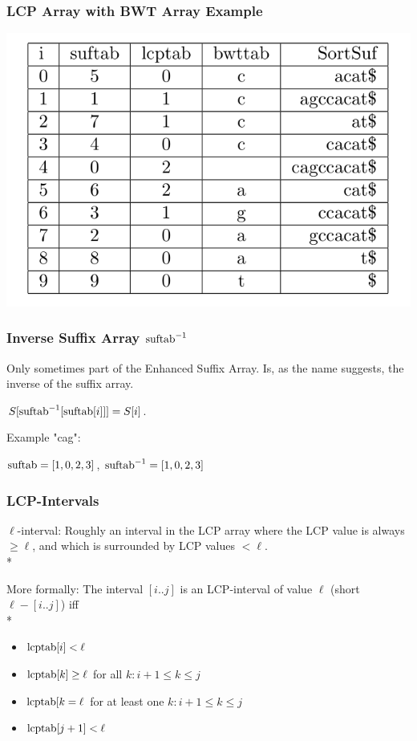 \documentclass[compress,handout]{beamer} %
\begin{document}
\begin{frame}
	\frametitle{LCP Array with BWT Array Example}
        \includegraphics[width=\textwidth, height=\textheight, keepaspectratio=true]{esa_with_bwttab_example}
\end{frame}

\begin{frame}
	\frametitle{Inverse Suffix Array $\hbox{suftab}^{-1}$}
	Only sometimes part of the Enhanced Suffix Array.
	Is, as the name suggests, the inverse of the suffix array.

	$S[\hbox{suftab}^{-1}[\hbox{suftab}[i]]]=S[i]$.

	Example "cag":

	$\hbox{suftab}=[1,0,2,3]$, $\hbox{suftab}^{-1}=[1,0,2,3]$
\end{frame}

\begin{frame}
	\frametitle{LCP-Intervals}
	$\ell$-interval: Roughly an interval in the LCP array where the LCP value is always
	$\ge \ell$, and which is surrounded by LCP values $< \ell$.\\*

	\vspace{5mm}
	More formally:
	The interval $[i..j]$ is an LCP-interval of value $\ell$ (short $\ell-[i..j]$)
	iff \\*
	\begin{itemize}
		\item $\hbox{lcptab}[i]<\ell$
		\item $\hbox{lcptab}[k]\ge \ell$ for all $k: i+1 \le k \le j$
		\item $\hbox{lcptab}[k=\ell$ for at least one $k: i+1 \le k \le j$
		\item $\hbox{lcptab}[j+1]<\ell$
	\end{itemize}
\end{frame}
\end{document}
